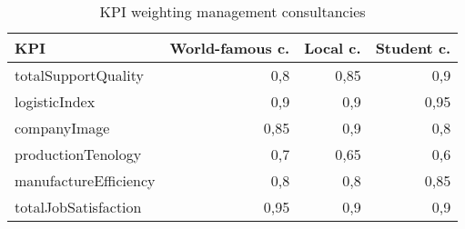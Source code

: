 \begin{table}[ht]
\centering
\begin{tabular}{|l|r|r|r|}
\hline
KPI                     & World-famous c.   & Local c.   & Student c.\\ \hline
totalSupportQuality     & 0,8               & 0,85       & 0,9       \\
logisticIndex           & 0,9               & 0,9        & 0,95      \\
companyImage            & 0,85              & 0,9        & 0,8       \\
productionTenology      & 0,7               & 0,65       & 0,6       \\
manufactureEfficiency   & 0,8               & 0,8        & 0,85      \\
totalJobSatisfaction    & 0,95              & 0,9        & 0,9       \\
\hline
\end{tabular}
\caption{KPI weighting management consultancies}
\label{mngc_weighting}
\end{table}

